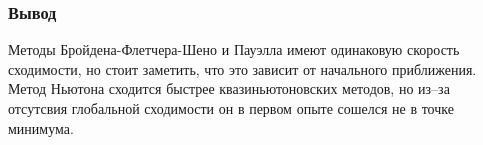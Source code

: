 \documentclass[a4paper, 14pt]{article}
\begin{document}
\subsubsection*{Вывод}
Методы Бройдена-Флетчера-Шено и Пауэлла имеют одинаковую скорость сходимости, но стоит заметить, что это зависит от начального приближения. Метод Ньютона сходится быстрее квазиньютоновских методов, но из--за отсутсвия глобальной сходимости он в первом опыте сошелся не в точке минимума. 





 
\end{document}
